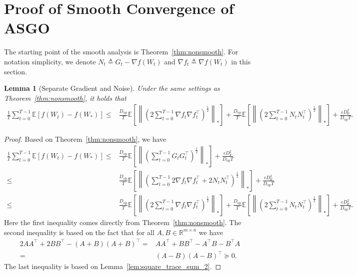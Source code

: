 \documentclass{article}
\newtheorem{lemma}{Lemma}
\theoremstyle{remark}
\newcommand{\Norm}[1]{\left\|#1\right\|}
\newcommand{\EE}{\mathbb{E}}
\newcommand{\RR}{\mathbb{R}}
\begin{document}
\section{Proof of Smooth Convergence of ASGO}\label{appendix:proof_smooth}
The starting point of the smooth analysis is Theorem~\ref{thm:nonsmooth}. For notation simplicity, we denote $N_t \triangleq G_t - \nabla f(W_t)$ and $\nabla f_t \triangleq \nabla f(W_t)$ in this section.
\begin{lemma}[Separate Gradient and Noise]\label{lem:convex_smooth_seperate_bias_variance}
    Under the same settings as Theorem~\ref{thm:nonsmooth}, it holds that
    \begin{align*}
        \frac{1}{T} \sum_{t=0}^{T-1} \EE[f(W_t) - f(W_*)]
        \le&
        \frac{D_{\mathrm{op}}}{T} \EE\left[ \Norm{\left( 2\sum_{t=0}^{T-1} \nabla f_t \nabla f_t^\top \right)^{\frac{1}{2}}}_* \right] + \frac{D_{\mathrm{op}}}{T} \EE\left[ \Norm{\left( 2\sum_{t=0}^{T-1} N_tN_t^\top\right)^{\frac{1}{2}}}_* \right] + \frac{\epsilon D_{\mathrm{F}}^2}{D_{\mathrm{op}} T}.
    \end{align*}
\end{lemma}
\begin{proof}
    Based on Theorem~\ref{thm:nonsmooth}, we have
    \begin{align*}
        \frac{1}{T} \sum_{t=0}^{T-1} \EE[f(W_t) - f(W_*)] \le& \frac{D_{\mathrm{op}}}{T} \EE\left[ \Norm{\left( \sum_{t=0}^{T-1} G_t G_t^\top\right)^{\frac{1}{2}}}_* \right] + \frac{\epsilon D_{\mathrm{F}}^2}{D_{\mathrm{op}} T} \\
        \le&
        \frac{D_{\mathrm{op}}}{T} \EE\left[ \Norm{\left( \sum_{t=0}^{T-1} 2\nabla f_t \nabla f_t^\top + 2N_tN_t^\top\right)^{\frac{1}{2}}}_* \right] + \frac{\epsilon D_{\mathrm{F}}^2}{D_{\mathrm{op}} T} \\
        \le&
        \frac{D_{\mathrm{op}}}{T} \EE\left[ \Norm{\left( 2\sum_{t=0}^{T-1} \nabla f_t \nabla f_t^\top \right)^{\frac{1}{2}}}_* \right] + \frac{D_{\mathrm{op}}}{T} \EE\left[ \Norm{\left( 2\sum_{t=0}^{T-1} N_tN_t^\top\right)^{\frac{1}{2}}}_* \right] + \frac{\epsilon D_{\mathrm{F}}^2}{D_{\mathrm{op}} T}.
    \end{align*}
    Here the first inequality comes directly from Theorem~\ref{thm:nonsmooth}. The second inequality is based on the fact that for all $A,B \in \RR^{m\times n}$ we have
    \begin{align*}
        2AA^\top + 2BB^\top - (A+B)(A+B)^\top =& AA^\top + BB^\top - A^\top B - B^\top A \\
        =& (A-B)(A-B)^\top \succeq 0 .
    \end{align*}
    The last inequality is based on Lemma~\ref{lem:square_trace_sum_2}.
\end{proof}
\end{document}
